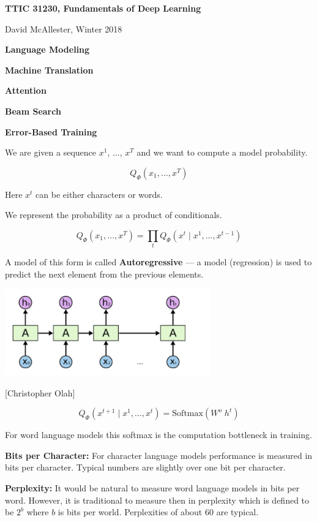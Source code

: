 



{\Huge

  \centerline{\bf TTIC 31230, Fundamentals of Deep Learning}
  \bigskip
  \centerline{David McAllester, Winter 2018}
  \vfill
  \centerline{\bf Language Modeling}
  \vfill
  \centerline{\bf Machine Translation}
  \vfill
  \centerline{\bf Attention}
  \vfill
  \centerline{\bf Beam Search}
  \vfill
  \centerline{\bf Error-Based Training}
  


We are given a sequence $x^1$, $\ldots$, $x^T$ and we want to compute a model probability.

\vfill
$$Q_\Phi(x_1,\ldots,x^T)$$

\vfill
Here $x^t$ can be either characters or words.

\vfill
We represent the probability as a product of conditionals.

\vfill
$$Q_\Phi(x_1,\ldots,x^T) = \prod_t Q_\Phi(x^t \;|\; x^1,\ldots,x^{t-1})$$

\vfill
A model of this form is called {\bf Autoregressive} --- a model (regression) is used to predict the next element from the previous elements.


\centerline{\includegraphics[width=3.5in]{../images/RNN}}
\centerline{{\large [Christopher Olah]}}

$$Q_\Phi(x^{t+1} \;|\; x^1,\ldots,x^t) = \mathrm{Softmax}(W^o\;h^t)$$

\vfill
For word language models this softmax is the computation bottleneck in training.


{\bf Bits per Character:}
For character language models performance is measured in bits per character.  Typical numbers are slightly over one bit per character.

\vfill
{\bf Perplexity:}
It would be natural to measure word language models in bits per word.  However, it is traditional to measure then in perplexity which is defined to be
$2^b$ where $b$ is bits per world.  Perplexities of about 60 are typical.

}
